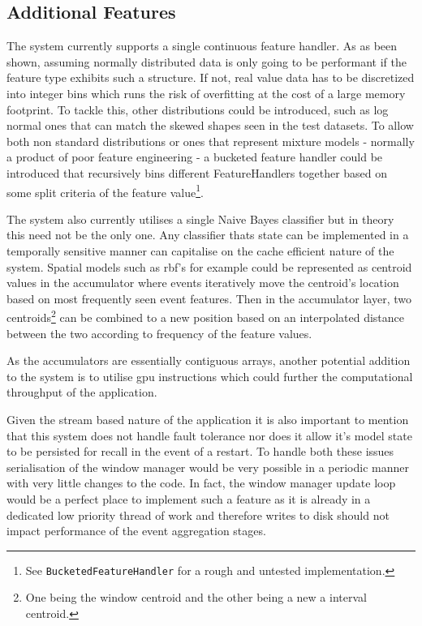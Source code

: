\documentclass[a4paper,11pt]{scrreprt}
\begin{document}
\subsection{Additional Features}
The system currently supports a single continuous feature handler. As as been shown, assuming normally distributed data is only going to be performant if the feature type exhibits such a structure. If not, real value data has to be discretized into integer bins which runs the risk of overfitting at the cost of a large memory footprint. To tackle this, other distributions could be introduced, such as log normal ones that can match the skewed shapes seen in the test datasets. To allow both non standard distributions or ones that represent mixture models - normally a product of poor feature engineering - a bucketed feature handler could be introduced that recursively bins different FeatureHandlers together based on some split criteria of the feature value\footnote{See \verb|BucketedFeatureHandler| for a rough and untested implementation.}. \

The system also currently utilises a single Naive Bayes classifier but in theory this need not be the only one. Any classifier thats state can be implemented in a temporally sensitive manner can capitalise on the cache efficient nature of the system. Spatial models such as \acrshort{rbf}'s for example could be represented as centroid values in the accumulator where events iteratively move the centroid's location based on most frequently seen event features. Then in the accumulator layer, two centroids\footnote{One being the window centroid and the other being a new a interval centroid.} can be combined to a new position based on an interpolated distance between the two according to frequency of the feature values.\

As the accumulators are essentially contiguous arrays, another potential addition to the system is to utilise \acrshort{gpu} instructions which could further the computational throughput of the application.\

Given the stream based nature of the application it is also important to mention that this system does not handle fault tolerance nor does it allow it's model state to be persisted for recall in the event of a restart. To handle both these issues serialisation of the window manager would be very possible in a periodic manner with very little changes to the code. In fact, the window manager update loop would be a perfect place to implement such a feature as it is already in a dedicated low priority thread of work and therefore writes to disk should not impact performance of the event aggregation stages.
\end{document}
